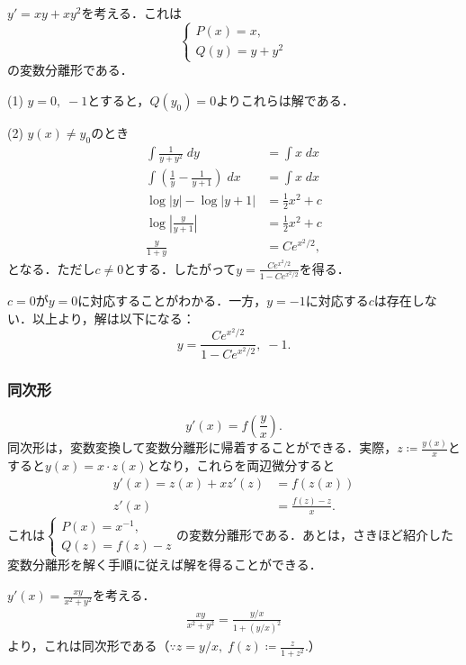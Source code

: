 \begin{example}
    $y' = xy + xy^2$を考える．これは
    \begin{equation}
        \begin{cases}
            P(x) = x, \\
            Q(y) = y+y^2
        \end{cases}
    \end{equation}
    の変数分離形である．

    (1) $y = 0, \; -1 $とすると，$Q(y_0)=0$よりこれらは解である．

    (2) $y(x) \neq y_0$のとき
    \begin{align*}
        \int \frac{1}{y+y^2} \; dy &= \int x \; dx \\
        \int \left( \frac{1}{y} - \frac{1}{y+1}\right) \; dx &= \int x \; dx \\
        \log |y| - \log |y+1| &= \frac{1}{2}x^2 + c \\
        \log \left|\frac{y}{y+1}\right| &= \frac{1}{2}x^2 + c \\
        \frac{y}{1+y} &= Ce^{x^2/2},
    \end{align*}
    となる．ただし$c \neq 0$とする．したがって$y=\frac{Ce^{x^2/2}}{1-Ce^{x^2/2}}$を得る．

    $c=0$が$y=0$に対応することがわかる．一方，$y=-1$に対応する$c$は存在しない．以上より，解は以下になる：
    \[ y = \frac{Ce^{x^2/2}}{1-Ce^{x^2/2}}, \; -1.\]
\end{example}

\subsubsection{同次形}
\begin{equation}
    y'(x) = f\left(\frac{y}{x}\right). \label{eq:同次形}
\end{equation}
同次形は，変数変換して変数分離形に帰着することができる．実際，$z \coloneqq \frac{y(x)}{x}$とすると$y(x) = x \cdot z(x)$となり，これらを両辺微分すると
\begin{align*}
    y'(x) = z(x) + xz'(z) &= f(z(x))  \\
    z'(x) &= \frac{f(z) - z}{x}.
\end{align*}
これは$\begin{cases} P(x)=x^{-1}, \\ Q(z)=f(z)-z \end{cases}$の変数分離形である．あとは，さきほど紹介した変数分離形を解く手順に従えば解を得ることができる．

\begin{example}
    $y'(x)=\frac{xy}{x^2+y^2}$を考える．
    \begin{align*}
        \frac{xy}{x^2+y^2} = \frac{y/x}{1+(y/x)^2}
    \end{align*}
    より，これは同次形である（$\because z = y/x, \; f(z) \coloneqq \frac{z}{1+z^2}.$）
\end{example}